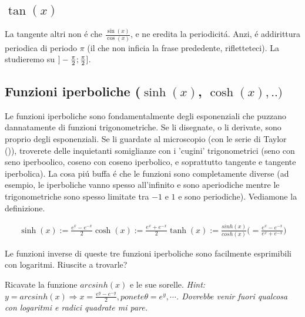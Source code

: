 \subsection{$\tan(x)$}
La tangente altri non \'e che $\frac{\sin(x)}{\cos(x)}$, e ne eredita la periodicit\'a. Anzi, \'e addirittura periodica di periodo $\pi$ (il che non inficia la frase prededente, rifletteteci). La studieremo su $]-\frac{\pi}{2};\frac{\pi}{2}]$.
\begin{schedaf}
	\rigaf{Dominio}{$]\-novanta;\novanta[$; \footnote{C'\'e un unico buco in $\novanta$ che significa infiniti buchi a distanza $\pi$!!!}}
\end{schedaf}


\subsection{Funzioni iperboliche ($\sinh(x)$, $\cosh(x), ..)$}

Le funzioni iperboliche sono fondamentalmente degli esponenziali che puzzano dannatamente di funzioni trigonometriche.
Se li disegnate, o li derivate, sono proprio degli esponenziali. Se li guardate al microscopio (con le serie di Taylor ()),
troverete delle inquietanti somiglianze con i 'cugini' trigonometrici (seno con seno iperboolico, coseno con coseno iperbolico,
e soprattutto tangente e tangente iperbolica). La cosa pi\'u buffa \'e che le funzioni sono completamente diverse (ad esempio,
le iperboliche vanno spesso all'infinito e sono aperiodiche mentre le trigonometriche sono spesso limitate tra $-1$ e $1$ e
sono periodiche). Vediamone la definizione.

\begin{eqnarray}
 \sinh(x) := \frac{e^x-e^{-x}}{2}
 \cosh(x) := \frac{e^x+e^{-x}}{2}
 \tanh(x) := \frac{sinh(x)}{cosh(x)} \bigg( = \frac{e^x-e^{-x}}{e^x+e^{-x}}\bigg)
\end{eqnarray}

Le funzioni inverse di queste tre funzioni iperboliche sono facilmente esprimibili con logaritmi. Riuscite a trovarle?

\begin{esercizio}
 Ricavate la funzione $arcsinh(x)$ e le sue sorelle. {\em Hint: $y=arcsinh(x) \Rightarrow x=\frac{e^y-e^{-y}}{2}, ponete \theta=e^y, \cdots$. Dovrebbe venir fuori qualcosa con logaritmi e radici quadrate mi pare.}
\end{esercizio}

